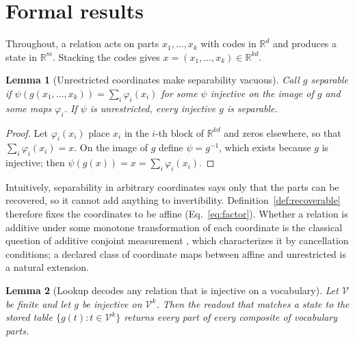 \documentclass[10pt]{article}
\theoremstyle{plain}
\newtheorem{lemma}{Lemma}
\theoremstyle{remark}
\newcommand{\R}{\mathbb{R}}
\newcommand{\Voc}{\mathcal{V}}
\begin{document}



\clearpage
\appendix
{}

\section{Formal results}
\label{app:proofs}

Throughout, a relation acts on parts $x_1, \ldots, x_k$ with codes in $\R^d$ and produces a state in $\R^m$. Stacking the codes gives $x = (x_1, \ldots, x_k) \in \R^{kd}$.



\begin{lemma}[Unrestricted coordinates make separability vacuous]
\label{lem:psi}
Call $g$ separable if $\psi(g(x_1, \ldots, x_k)) = \sum_i \varphi_i(x_i)$ for some $\psi$ injective on the image of $g$ and some maps $\varphi_i$. If $\psi$ is unrestricted, every injective $g$ is separable.
\end{lemma}

\begin{proof}
Let $\varphi_i(x_i)$ place $x_i$ in the $i$-th block of $\R^{kd}$ and zeros elsewhere, so that $\sum_i \varphi_i(x_i) = x$. On the image of $g$ define $\psi = g^{-1}$, which exists because $g$ is injective; then $\psi(g(x)) = x = \sum_i \varphi_i(x_i)$.
\end{proof}

\noindent
Intuitively, separability in arbitrary coordinates says only that the parts can be recovered, so it cannot add anything to invertibility. Definition~\ref{def:recoverable} therefore fixes the coordinates to be affine (Eq.~\ref{eq:factor}). Whether a relation is additive under some monotone transformation of each coordinate is the classical question of additive conjoint measurement \citep{luce1964}, which characterizes it by cancellation conditions; a declared class of coordinate maps between affine and unrestricted is a natural extension.

\begin{lemma}[Lookup decodes any relation that is injective on a vocabulary]
\label{lem:lookup}
Let $\Voc$ be finite and let $g$ be injective on $\Voc^k$. Then the readout that matches a state to the stored table $\{g(t) : t \in \Voc^k\}$ returns every part of every composite of vocabulary parts.
\end{lemma}
\end{document}
